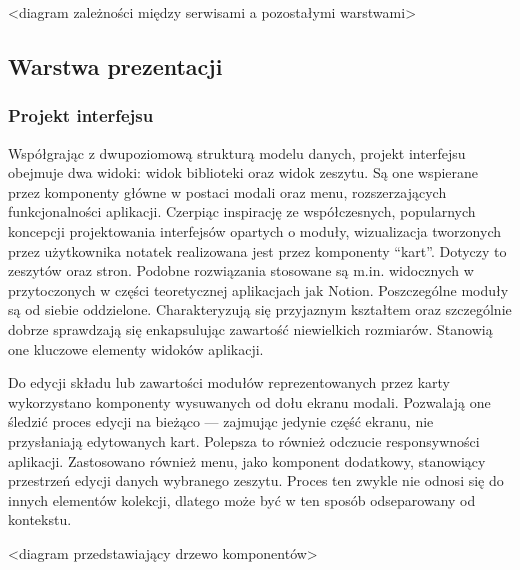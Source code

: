 <diagram zależności między serwisami a pozostałymi warstwami>

\subsection{Warstwa prezentacji}
\subsubsection{Projekt interfejsu}
Współgrając z dwupoziomową strukturą modelu danych, projekt interfejsu obejmuje dwa widoki: widok biblioteki oraz widok zeszytu.
Są one wspierane przez komponenty główne w postaci modali oraz menu, rozszerzających funkcjonalności aplikacji.
Czerpiąc inspirację ze współczesnych, popularnych koncepcji projektowania interfejsów opartych o moduły, wizualizacja
tworzonych przez użytkownika notatek realizowana jest przez komponenty \enquote{kart}. Dotyczy to zeszytów oraz stron.
Podobne rozwiązania stosowane są m.in. widocznych w przytoczonych w części teoretycznej aplikacjach jak Notion.
Poszczególne moduły są od siebie oddzielone. Charakteryzują się przyjaznym kształtem oraz szczególnie dobrze sprawdzają
się enkapsulując zawartość niewielkich rozmiarów. Stanowią one kluczowe elementy widoków aplikacji.

Do edycji składu lub zawartości modułów reprezentowanych przez karty wykorzystano komponenty wysuwanych od dołu ekranu modali.
Pozwalają one śledzić proces edycji na bieżąco — zajmując jedynie część ekranu, nie przysłaniają edytowanych kart.
Polepsza to również odczucie responsywności aplikacji.
Zastosowano również menu, jako komponent dodatkowy, stanowiący przestrzeń edycji danych wybranego zeszytu. Proces ten zwykle
nie odnosi się do innych elementów kolekcji, dlatego może być w ten sposób odseparowany od kontekstu.

<diagram przedstawiający drzewo komponentów>

